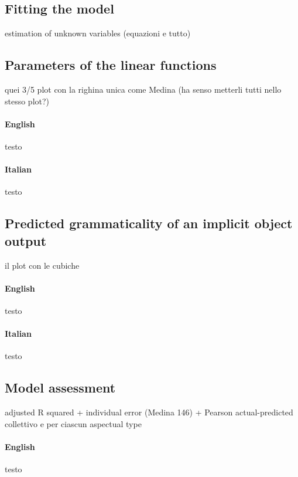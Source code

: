 \subsection{Fitting the model} 

estimation of unknown variables (equazioni e tutto)


\subsection{Parameters of the linear functions} 

quei 3/5 plot con la righina unica come Medina (ha senso metterli tutti nello stesso plot?)

\paragraph{English} testo

\paragraph{Italian} testo


\subsection{Predicted grammaticality of an implicit object output} 

il plot con le cubiche

\paragraph{English} testo

\paragraph{Italian} testo


\subsection{Model assessment} 

adjusted R squared + 
individual error (Medina 146) +
Pearson actual-predicted collettivo e per ciascun aspectual type

\paragraph{English} testo

